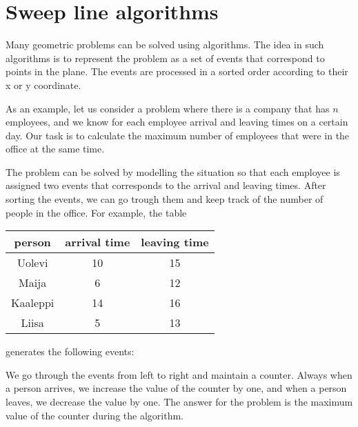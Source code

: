 \chapter{Sweep line algorithms}


Many geometric problems can be solved using
 algorithms.
The idea in such algorithms is to represent
the problem as a set of events that correspond
to points in the plane.
The events are processed in a sorted order
according to their x or y coordinate.

As an example, let us consider a problem
where there is a company that has $n$ employees,
and we know for each employee arrival and
leaving times on a certain day.
Our task is to calculate the maximum number of
employees that were in the office at the same time.

The problem can be solved by modelling the situation
so that each employee is assigned two events that
corresponds to the arrival and leaving times.
After sorting the events, we can go trough them
and keep track of the number of people in the office.
For example, the table
\begin{center}
\begin{tabular}{ccc}
person & arrival time & leaving time \\
\hline
Uolevi & 10 & 15 \\
Maija & 6 & 12 \\
Kaaleppi & 14 & 16 \\
Liisa & 5 & 13 \\
\end{tabular}
\end{center}
generates the following events:
\begin{center}
\end{center}
We go through the events from left to right
and maintain a counter.
Always when a person arrives, we increase
the value of the counter by one,
and when a person leaves,
we decrease the value by one.
The answer for the problem is the maximum
value of the counter during the algorithm.

